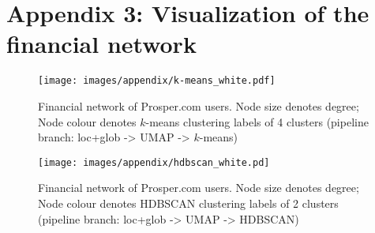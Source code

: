 \chapter{Appendix 3: Visualization of the financial network}
\label{appendix:k-means_time_struc}

\begin{figure}[!ht]
	\centering
	\texttt{[image: images/appendix/k-means\_white.pdf]}\\
	\caption{Financial network of Prosper.com users. Node size denotes degree; Node colour denotes $k$-means clustering labels of 4 clusters (pipeline branch: loc+glob -> UMAP -> $k$-means)}
	\label{fig:App20}
\end{figure}

\begin{figure}[!ht]
	\centering
	\texttt{[image: images/appendix/hdbscan\_white.pd]}\\
	\caption{Financial network of Prosper.com users. Node size denotes degree; Node colour denotes HDBSCAN clustering labels of 2 clusters (pipeline branch: loc+glob -> UMAP -> HDBSCAN)}
	\label{fig:App21}
\end{figure}